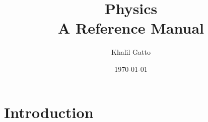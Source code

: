 \documentclass{article}
\title{Physics\\A Reference Manual}
\author{Khalil Gatto}
\date{\today}
\begin{document}
\maketitle

\section{Introduction}
\end{document}
